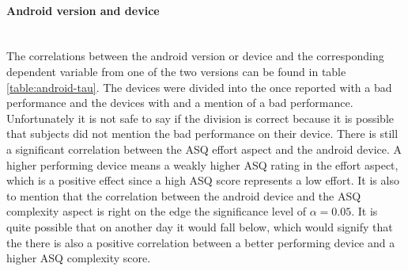 \begin{table}[htb]
  \caption{Correlation between highest achieved degree and the dependent variables calculated with the \gls{tau}}
  \label{table:degree-tau}
  \end{table}


\paragraph{Android version and device}\mbox{}\\
The correlations between the \gls{android} version or device and the corresponding dependent variable from one of the two versions can be found in table \ref{table:android-tau}.
The devices were divided into the once reported with a bad performance and the devices with and a mention of a bad performance.
Unfortunately it is not safe to say if the division is correct because it is possible that subjects did not mention the bad performance on their device.
There is still a significant correlation between the \gls{ASQ} effort aspect and the \gls{android} device.
A higher performing device means a weakly higher ASQ rating in the effort aspect, which is a positive effect since a high \gls{ASQ} score represents a low effort.
It is also to mention that the correlation between the \gls{android} device and the \gls{ASQ} complexity aspect is right on the edge the significance level of $\alpha = 0.05$.
It is quite possible that on another day it would fall below, which would signify that the there is also a positive correlation between a better performing device and a higher \gls{ASQ} complexity score.


